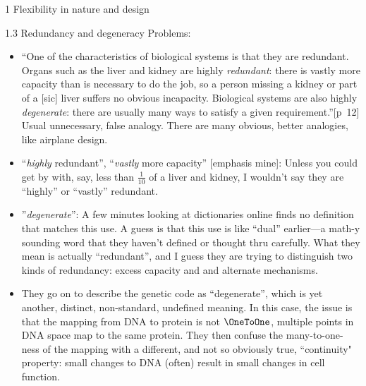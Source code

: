\documentclass[12pt]{PalisadesLakesBook}
\begin{document}
\begin{plSection}{1 Flexibility in nature and design}
\begin{plSection}{1.3 Redundancy and degeneracy}
Problems:
\begin{itemize}
  
  \item ``One of the characteristics of biological systems
is that they are redundant. 
Organs such as the liver and kidney are highly \emph{redundant}:
there is vastly more capacity than is necessary to do the job,
so a person missing a kidney or part of a [sic] liver suffers
no obvious incapacity.
Biological systems are also highly \emph{degenerate}:
there are usually many ways 
to satisfy a given requirement.''[p~12]
Usual unnecessary, false analogy.
  There are many obvious, better analogies, like airplane design.
  
  \item ``\emph{highly} redundant'',
  ``\emph{vastly} more capacity'' [emphasis mine]:
  Unless you could get by with, say,  less than $\frac{1}{10}$ 
  of a liver and kidney, I wouldn't say they are ``highly'' or
  ``vastly'' redundant.
  
  \item''\emph{degenerate}'': A few minutes looking at 
  dictionaries online finds no definition that matches this use.
  A guess is that this use is like ``dual'' earlier---a math-y
  sounding word that they haven't defined or thought thru
  carefully. What they mean is actually ``redundant'',
  and I guess they are trying to distinguish two kinds 
  of redundancy: excess capacity and and alternate mechanisms.
  
  \item They go on to describe the genetic code as ``degenerate'',
  which is yet another, distinct, non-standard, undefined meaning. 
  In this case, the issue is that
  the mapping from DNA to protein is not $\OneToOne$,
  multiple points in DNA space map to the same protein.
  They then confuse the many-to-one-ness of the mapping
  with a different, and not so obviously true, ``continuity" 
  property:
  small changes to DNA (often) result 
  in small changes in cell function.
  

\end{itemize}
\end{plSection}
\end{plSection}
\end{document}

